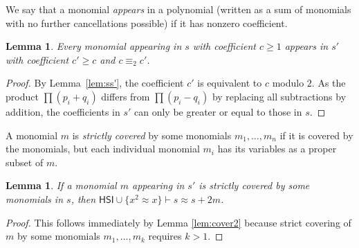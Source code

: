 \documentclass[eqnor,reqno]{amsart}
\theoremstyle{plain}
\newtheorem{lem}[thm]{Lemma}
\theoremstyle{definition}
\newcommand{\HSI}{\textsf{HSI}}
\begin{document}
We say that a monomial \emph{appears} in a polynomial (written as a sum of monomials with no further cancellations possible) if it has nonzero coefficient.

\begin{lem}\label{lem:equivmod2}
Every monomial appearing in $s$ with coefficient $c\geq 1$ appears in $s'$ with coefficient $c'\geq c$ and $c\equiv_2 c'$.
\end{lem}
\begin{proof}
By Lemma~\ref{lem:ss'}, the coefficient $c'$ is equivalent to $c$ modulo $2$.  As the product $\prod(p_i + q_i)$ differs from $\prod(p_i - q_i)$ by replacing all subtractions by addition, the coefficients in $s'$ can only be greater or equal to those in $s$. 
\end{proof}
A monomial $m$ is \emph{strictly covered} by some monomials $m_1,\dots,m_n$ if it is covered by the monomials, but each individual monomial $m_i$ has its variables as a proper subset of $m$.
\begin{lem}
If a monomial $m$ appearing in $s'$ is strictly covered by some monomials in $s$, then $\HSI\cup\{x^2\approx x\}\vdash s\approx s+2m$.
\end{lem}
\begin{proof}
This follows immediately by Lemma \ref{lem:cover2} because strict covering of $m$ by some monomials $m_1,\dots,m_k$ requires $k>1$.
\end{proof}
\end{document}
